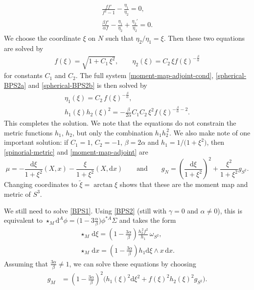 \documentclass[pdftex]{sigma}
\newcommand{\1}{{\mathbb{1}}}
\def \d{\mathrm{d}}
\numberwithin{equation}{section}
\begin{document}
\begin{gather*}
\frac{ff'}{f^2-1}-\frac{\eta_1}{\eta_2} =0, \\
\frac{\beta f'}{\alpha f} - \frac{\eta_1}{\eta_2} +\frac{\eta_2'}{\eta_2}=0.
\end{gather*}
We choose the coordinate $\xi$ on $N$ such that $\eta_2/\eta_1=\xi$. Then these two equations are solved by
\begin{align*}
f(\xi)= \sqrt{1+C_1\,\xi^2},\qquad
\eta_2(\xi) = C_2\,\xi f(\xi)^{-\frac{\beta}{\alpha}}
\end{align*}
for constants $C_1$ and $C_2$. The full system \eqref{moment-map-adjoint-cond}, \eqref{spherical-BPS2a} and \eqref{spherical-BPS2b} is then solved by
\begin{gather*}
\eta_1(\xi) = C_2\,f(\xi)^{-\frac{\beta}{\alpha}},\nonumber \\
h_1(\xi)h_2(\xi)^2 = -\frac{\beta}{2\alpha}C_1C_2\,\xi^2 f(\xi)^{-\frac{\beta}{\alpha}-2}.%
\end{gather*}
This completes the solution. We note that the equations do not constrain the metric functions $h_1$, $h_2$, but only the combination $h_1h_2^{\,2}$. We also make note of one important solution: if $C_1=1$, $C_2=-1$, $\beta=2\alpha$ and $h_1=1/\big(1+\xi^2\big)$, then \eqref{spinorial-metric} and \eqref{moment-map-adjoint} are{\samepage
\begin{equation*}
\mu = -\frac{\d\xi}{1+\xi^2}(X,x)-\frac{\xi}{1+\xi^2}(X,\d x)\qquad\text{and}\qquad g_N = \left(\frac{\d\xi}{1+\xi^2}\right)^2 + \frac{\xi^2}{1+\xi^2}g_{S^2}.
\end{equation*}
Changing coordinates to $\tilde{\xi}=\arctan\xi$ shows that these are the moment map and metric of $S^3$.}

We still need to solve \eqref{BPS1}. Using \eqref{BPS2} (still with $\gamma=0$ and $\alpha\neq0$), this is equivalent to $\star_{M} \d^A\phi = \big(1-3\frac{\alpha}{\beta}\big)\phi^{\ast A}\Sigma$ and takes the form
\begin{gather*}
\star_{M}\,\d\xi = \left(1-\frac{3\alpha}{\beta}\right)\frac{h_2^{\,2}f^2}{h_1}\,\omega_{S^2}, \\
\star_{M}\,\d x = \left(1-\frac{3\alpha}{\beta}\right)h_1 \d\xi\wedge x\,\d x.
\end{gather*}
Assuming that $\frac{3\alpha}{\beta}\neq1$, we can solve these equations by choosing
\begin{align*}
g_M &= \left(1-\frac{3\alpha}{\beta}\right)^2\bigl(h_1(\xi)^2\d\xi^2 + f(\xi)^2h_2(\xi)^2g_{S^2}\bigr).
\end{align*}
\end{document}
